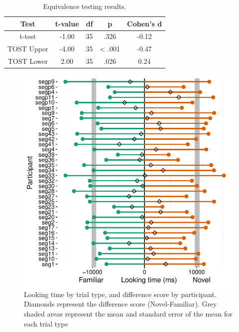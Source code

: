 \documentclass[man,floatsintext]{apa6}
\begin{document}
\begin{table}[tbp]
\begin{center}
\begin{threeparttable}
\caption{\label{tab:tost}Equivalence testing results.}
\begin{tabular}{ccccc}
\toprule
Test & t-value & df & p & Cohen's d\\
\midrule
t-test & -1.00 & 35 & .326 & -0.12\\
TOST Upper & -4.00 & 35 & < .001 & -0.47\\
TOST Lower & 2.00 & 35 & .026 & 0.24\\
\bottomrule
\end{tabular}
\end{threeparttable}
\end{center}
\end{table}

\begin{figure}
\includegraphics[width=1\linewidth]{segmentation_manuscript_files/figure-latex/unnamed-chunk-3-1} \caption{Looking time by trial type, and difference score by participant. Diamonds represent the difference score (Novel-Familiar). Grey shaded areas represent the mean and standard error of the mean for each trial type}\label{fig:unnamed-chunk-3}
\end{figure}
\end{document}
